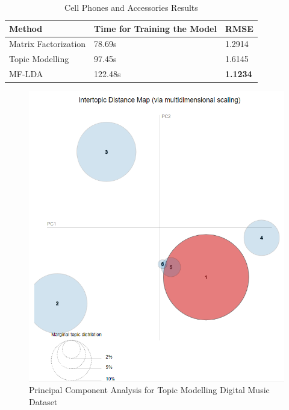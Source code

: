 \documentclass[10pt,conference]{IEEEtran}
\begin{document}
\begin{table}[h]
\centering
\caption{Cell Phones and Accessories Results}\label{Cell Phones and Accessories Results}
\renewcommand{\arraystretch}{1.3}
\begin{tabular}{ lll }
\toprule
\textbf{Method} & \textbf{Time for Training the Model} & \textbf{RMSE} \\
\toprule
Matrix Factorization & 78.69s & 1.2914 \\
\hline
Topic Modelling & 97.45s & 1.6145 \\
\hline
MF-LDA & 122.48s  & \textbf{1.1234} \\ 
\bottomrule        
\end{tabular}
\end{table}




\begin{figure}[t]
  \includegraphics[width=\linewidth]{img/lda/1.PNG}
  \caption{Principal Component Analysis for Topic Modelling Digital Music Dataset}
  \label{fig:1}
\endminipage\hfill
{}

\end{figure}
\end{document}
